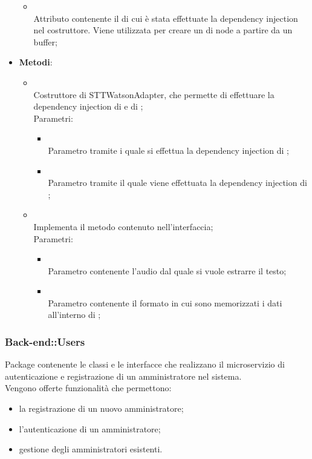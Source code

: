 \begin{itemize}
\begin{itemize}
		\item[]  \\
		Attributo contenente il  di cui è stata effettuate la dependency injection nel costruttore. Viene utilizzata per creare un  di node a partire da un buffer;
	\end{itemize}
	\item \textbf{Metodi}:
	\begin{itemize}
		\item[]  \\		Costruttore di STTWatsonAdapter, che permette di effettuare la dependency injection di  e di ;\\
		Parametri:
		\begin{itemize}
			\item {} \\
			Parametro tramite i quale si effettua la dependency injection di ;
			\item {} \\
			Parametro tramite il quale viene effettuata la dependency injection di ;
		\end{itemize}
		\item[]  \\			Implementa il metodo  contenuto nell'interfaccia;\\
		Parametri:
		\begin{itemize}
			\item {} \\
			Parametro contenente l'audio dal quale si vuole estrarre il testo;
			\item {} \\
			Parametro contenente il formato in cui sono memorizzati i dati all'interno di ;
		\end{itemize}
	\end{itemize}
\end{itemize}
\FloatBarrier

\subsubsection{Back-end::Users}
Package contenente le classi e le interfacce che realizzano il microservizio di autenticazione e registrazione di un amministratore nel sistema.\\
Vengono offerte funzionalità che permettono:
\begin{itemize}
	\item la registrazione di un nuovo amministratore;
	\item l'autenticazione di un amministratore;
	\item gestione degli amministratori esistenti.
\end{itemize}

